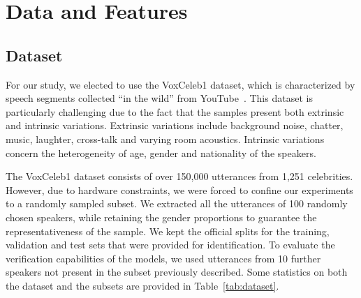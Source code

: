 \documentclass[conference]{IEEEtran}
\begin{document}
\section{Data and Features}
\label{sec:dataset}

\subsection{Dataset}

For our study, we elected to use the VoxCeleb1 dataset, which is characterized by speech segments collected ``in the wild'' from YouTube~\cite{nagrani2020voxceleb,chung2018voxceleb2,chung2019delving}. This dataset is particularly challenging due to the fact that the samples present both extrinsic and intrinsic variations. Extrinsic variations include background noise, chatter, music, laughter, cross-talk and varying room acoustics. Intrinsic variations concern the heterogeneity of age, gender and nationality of the speakers. 

The VoxCeleb1 dataset consists of over 150,000 utterances from 1,251 celebrities. However, due to hardware constraints, we were forced to confine our experiments to a randomly sampled subset. We extracted all the utterances of 100 randomly chosen speakers, while retaining the gender proportions to guarantee the representativeness of the sample. We kept the official splits for the training, validation and test sets that were provided for identification. To evaluate the verification capabilities of the models, we used utterances from 10 further speakers not present in the subset previously described. Some statistics on both the dataset and the subsets are provided in Table~\ref{tab:dataset}.
\end{document}
